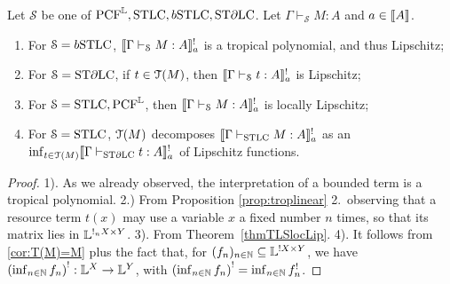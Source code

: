 \begin{theorem}\label{thm:taylor}
Let $\mathcal S$ be one of $\RM{PCF}^{\Lawv},\STLC,\BSTLC,\STDLC$. Let $\Gamma\vdash_{\mathcal S}M:A$ and $a\in \llbracket A\rrbracket$.
\begin{enumerate}
\item For $\mathcal S=\BSTLC$, $\llbracket\Gamma\vdash_{\mathcal S}M:A\rrbracket^{!}_{a}$ is a tropical polynomial, and thus Lipschitz;

\item For $\mathcal S=\mathrm{ST}\partial\mathrm{LC}$, if $t\in \mathcal{T}(M)$, then $\llbracket\Gamma\vdash_{\mathcal S}t:A\rrbracket^{!}_{a}$ is Lipschitz;

\item For $\mathcal S=\mathrm{STLC},\mathrm{PCF}^{\mathbb{L}}$, then $\llbracket\Gamma\vdash_{\mathcal S}M:A\rrbracket^{!}_{a}$ is locally Lipschitz;

\item For $\mathcal S=\mathrm{STLC}$, $\mathcal{T}(M)$ decomposes $\llbracket\Gamma \vdash_{\mathrm{STLC}} M:A\rrbracket^!_{a}$ as an $\inf_{t\in\mathcal{T}(M)}\llbracket\Gamma\vdash_{\mathrm{ST}\partial\mathrm{LC}} t:A\rrbracket^!_{a}$ of {Lipschitz} functions.
\end{enumerate}

\end{theorem}
\begin{proof}
1). As we already observed, the interpretation of a bounded term is a tropical polynomial.
2.) From Proposition \ref{prop:troplinear} 2.~observing that a resource term $t(x)$ may use a variable $x$ a fixed number $n$ times, so that its matrix lies in $\mathbb{L}^{!_{n}X\times Y}$. 
3). From Theorem~\ref{thmTLSlocLip}.
4). It follows from \autoref{cor:T(M)=M} plus the fact that, for $(f_n)_{n\in\mathbb{N}}\subseteq\mathbb{L}^{!X\times Y}$, we have $\left(\inf_{n\in\mathbb{N}} f_n\right)^!:\mathbb{L}^X\to\mathbb{L}^Y$, with $\left(\inf_{n\in\mathbb{N}} f_n\right)^!=\inf_{n\in\mathbb{N}} f_n^!$.
\end{proof}




%
%
%


